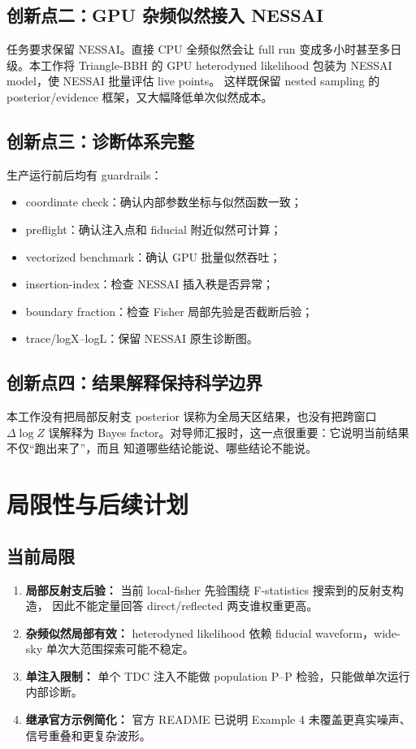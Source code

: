 \documentclass[11pt,a4paper]{ctexart}
\begin{document}
\subsection{创新点二：GPU 杂频似然接入 NESSAI}

任务要求保留 NESSAI。直接 CPU 全频似然会让 full run 变成多小时甚至多日级。本工作将
Triangle-BBH 的 GPU heterodyned likelihood 包装为 NESSAI model，使 NESSAI 批量评估 live points。
这样既保留 nested sampling 的 posterior/evidence 框架，又大幅降低单次似然成本。

\subsection{创新点三：诊断体系完整}

生产运行前后均有 guardrails：
\begin{itemize}
  \item coordinate check：确认内部参数坐标与似然函数一致；
  \item preflight：确认注入点和 fiducial 附近似然可计算；
  \item vectorized benchmark：确认 GPU 批量似然吞吐；
  \item insertion-index：检查 NESSAI 插入秩是否异常；
  \item boundary fraction：检查 Fisher 局部先验是否截断后验；
  \item trace/logX--logL：保留 NESSAI 原生诊断图。
\end{itemize}

\subsection{创新点四：结果解释保持科学边界}

本工作没有把局部反射支 posterior 误称为全局天区结果，也没有把跨窗口 \(\Delta\log Z\)
误解释为 Bayes factor。对导师汇报时，这一点很重要：它说明当前结果不仅“跑出来了”，而且
知道哪些结论能说、哪些结论不能说。

\section{局限性与后续计划}

\subsection{当前局限}

\begin{enumerate}
  \item \textbf{局部反射支后验：} 当前 local-fisher 先验围绕 F-statistics 搜索到的反射支构造，
  因此不能定量回答 direct/reflected 两支谁权重更高。
  \item \textbf{杂频似然局部有效：} heterodyned likelihood 依赖 fiducial waveform，wide-sky
  单次大范围探索可能不稳定。
  \item \textbf{单注入限制：} 单个 TDC 注入不能做 population P--P 检验，只能做单次运行内部诊断。
  \item \textbf{继承官方示例简化：} 官方 README 已说明 Example 4 未覆盖更真实噪声、信号重叠和更复杂波形。
\end{enumerate}
\end{document}
